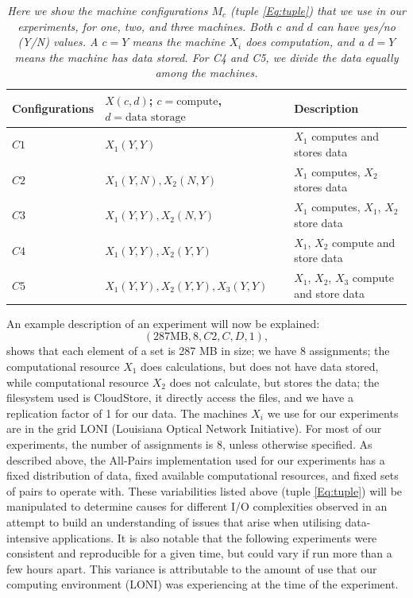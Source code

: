 \documentclass{rspublic}
\begin{document}
\begin{table}
\begin{center}
    \begin{tabular}{ | l | l | l |}
    \hline
    Configurations & $X(c,d)$; $c= \mbox{compute}$, $d=\mbox{data storage}$ & Description  \\ \hline
    $C1$ & $X_1(Y,Y)$  & $X_1$ computes and stores data\\ \hline    
    $C2$ & $X_1(Y,N), X_2(N,Y)$  & $X_1$ computes, $X_2$ stores data \\ \hline
    $C3$ & $X_1(Y,Y), X_2(N,Y)$  & $X_1$ computes, $X_1$, $X_2$ store data \\ \hline
    $C4$ & $X_1(Y,Y), X_2(Y,Y)$  & $X_1$, $X_2$ compute and store data \\ \hline
    $C5$ & $X_1(Y,Y), X_2(Y,Y), X_3(Y,Y)$  & $X_1$, $X_2$, $X_3$ compute and store data \\ 
    \hline
    \end{tabular}
\end{center}
    \caption{\textit{Here we show the machine configurations $M_c$ (tuple
\ref{Eq:tuple}) that we use in our experiments, for one, two, and three
machines. Both $c$ and $d$ can have yes/no (Y/N) values. A $c = Y$ means
the machine $X_i$ does computation, and a $d = Y$ means the machine has
data stored. For C4 and C5, we divide the data equally among the
machines.}}
    \label{Tab:Configs}
\end{table}

An example description of an experiment will now be explained:
 \begin{equation}
(287 \mbox{MB}, 8, C2, C, D, 1),
\end{equation}
shows that each element of a set is 287 MB in size; we have 8
assignments; the computational resource $X_1$ does calculations, but
does not have data stored, while computational resource $X_2$ does not
calculate, but stores the data; the filesystem used is CloudStore, it
directly access the files, and we have a replication factor of 1 for our
data. The machines $X_i$ we use for our experiments are in the grid LONI
(Louisiana Optical Network Initiative). For most of our experiments, the
number of assignments is 8, unless otherwise specified.  As described
above, the All-Pairs implementation used for our experiments has a fixed
distribution of data, fixed available computational resources, and fixed
sets of pairs to operate with.  These variabilities listed above (tuple
\ref{Eq:tuple}) will be manipulated to determine causes for different
I/O complexities observed in an attempt to build an understanding of
issues that arise when utilising data-intensive applications. It is also
notable that the following experiments were consistent and reproducible
for a given time, but could vary if run more than a few hours apart.
This variance is attributable to the amount of use that our computing
environment (LONI) was experiencing at the time of the experiment.
\end{document}
